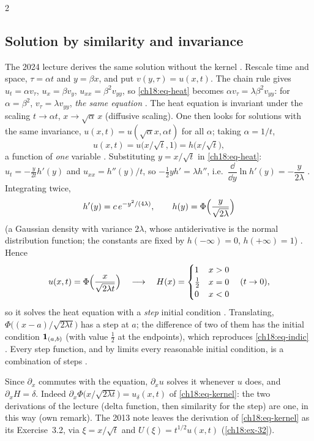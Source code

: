 \begin{paracol}{2}
\subsection{Solution by similarity and invariance}
The 2024 lecture derives the same solution without the kernel . Rescale time and space, $\tau=\alpha t$ and $y=\beta x$, and put $v(y,\tau)=u(x,t)$. The chain rule gives $u_t=\alpha v_\tau$, $u_x=\beta v_y$, $u_{xx}=\beta^2v_{yy}$, so \eqref{ch18:eq-heat} becomes $\alpha v_\tau=\lambda\beta^2v_{yy}$: for $\alpha=\beta^2$, $v_\tau=\lambda v_{yy}$, \emph{the same equation} . The heat equation is invariant under the scaling $t\to\alpha t$, $x\to\sqrt\alpha\,x$ (diffusive scaling). One then looks for solutions with the same invariance, $u(x,t)=u(\sqrt\alpha x,\alpha t)$ for all $\alpha$; taking $\alpha=1/t$,
\[
  u(x,t)=u\bigl(x/\sqrt t,1\bigr)=h\bigl(x/\sqrt t\bigr) ,
\]
a function of \emph{one} variable . Substituting $y=x/\sqrt t$ in \eqref{ch18:eq-heat}: $u_t=-\tfrac{y}{2t}h'(y)$ and $u_{xx}=h''(y)/t$, so $-\tfrac12yh'=\lambda h''$, i.e.\ $\dfrac{\dd}{\dd y}\ln h'(y)=-\dfrac{y}{2\lambda}$ . Integrating twice,
\[
  h'(y)=c\,e^{-y^2/(4\lambda)},\qquad h(y)=\Phi\Bigl(\frac y{\sqrt{2\lambda}}\Bigr)
\]
(a Gaussian density with variance $2\lambda$, whose antiderivative is the normal distribution function; the constants are fixed by $h(-\infty)=0$, $h(+\infty)=1$) . Hence
\begin{equation}\label{ch18:eq-step}
  u(x,t)=\Phi\Bigl(\frac{x}{\sqrt{2\lambda t}}\Bigr)\quad\longrightarrow\quad H(x)=\begin{cases}1&x>0\\ \tfrac12&x=0\\ 0&x<0\end{cases}\quad(t\to0),
\end{equation}
so it solves the heat equation with a \emph{step} initial condition . Translating, $\Phi\bigl((x-a)/\sqrt{2\lambda t}\bigr)$ has a step at $a$; the difference of two of them has the initial condition $\mathbf{1}_{(a,b)}$ (with value $\tfrac12$ at the endpoints), which reproduces \eqref{ch18:eq-indic} . Every step function, and by limits every reasonable initial condition, is a combination of steps .
\begin{remark}
Since $\partial_x$ commutes with the equation, $\partial_xu$ solves it whenever $u$ does, and $\partial_xH=\delta$. Indeed $\partial_x\Phi\bigl(x/\sqrt{2\lambda t}\bigr)=u_\delta(x,t)$ of \eqref{ch18:eq-kernel}: the two derivations of the lecture (delta function, then similarity for the step) are one, in this way (own remark). The 2013 note leaves the derivation of \eqref{ch18:eq-kernel} as its Exercise~3.2, via $\xi=x/\sqrt t$ and $U(\xi)=t^{1/2}u(x,t)$ (\cref{ch18:ex-32}).

\end{remark}
\end{paracol}
